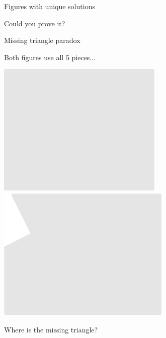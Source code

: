 \documentclass[14pt]{beamer}
\begin{document}
\begin{frame}{Figures with unique solutions}
\begin{center}
            \bigskip\medskip
            
            Could you prove it?
        \end{center}
    \end{frame}


    \begin{frame}{Missing triangle paradox}
        \begin{center}
            Both figures use all 5 pieces...

            \vspace{36pt}

            \;\;\includegraphics[scale=0.5]{figures/figure022b.pdf}\qquad
            \qquad
            \includegraphics[scale=0.5]{figures/figure026be.pdf}\;\;\,

            \vspace{32pt}

            Where is the missing triangle?
        \end{center}
    \end{frame}
\end{document}
